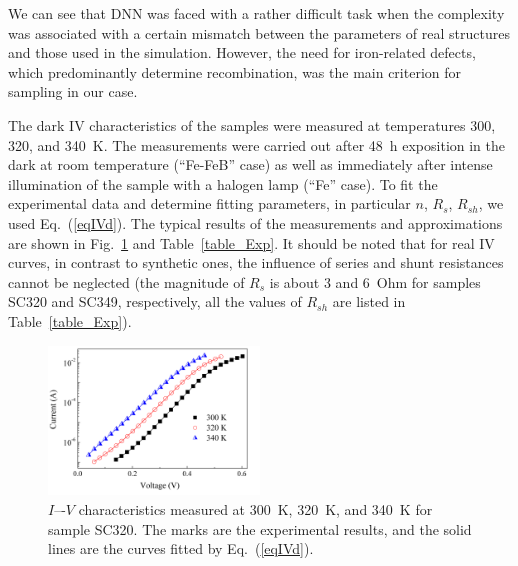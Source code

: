 \documentclass[num-refs]{wiley-article} %
\begin{document}
We can see that DNN was faced with a rather difficult task
when the complexity was associated with a certain mismatch between the parameters of real structures and those used in the simulation.
However, the need for iron-related defects, which predominantly determine recombination, was the main criterion for sampling in our case.


The dark IV characteristics of the samples were measured at temperatures
300, 320, and 340~K.
The measurements were carried out after 48~h exposition in the dark at room temperature
(``Fe-FeB'' case)
as well as immediately after intense illumination of the sample with a halogen lamp
(``Fe'' case).
To fit the experimental data and determine fitting parameters, in particular $n$, $R_s$, $R_{sh}$,
we used Eq.~(\ref{eqIVd}).
The typical results of the measurements and approximations are shown in Fig.~\ref{fig_IVexp}
and Table~\ref{table_Exp}.
It should be noted that for real IV curves, in contrast to synthetic ones,
the influence of series and shunt resistances cannot be neglected
(the magnitude of $R_s$ is about 3 and 6~Ohm for samples SC320 and SC349, respectively,
all the values of $R_{sh}$ are listed in Table~\ref{table_Exp}).

\begin{figure}[t]
\centering
\includegraphics[width=0.5\textwidth]{F9}
\caption{
$I$–-$V$ characteristics measured at 300~K, 320~K, and 340~K for
sample SC320.
The marks are the experimental results, and
the solid lines are the curves fitted by
Eq.~(\ref{eqIVd}).
}
\label{fig_IVexp}
\end{figure}
\end{document}
